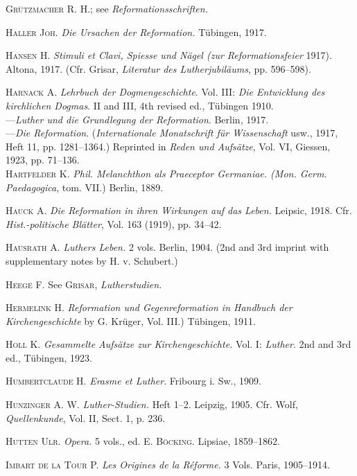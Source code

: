 \textsc{Grützmacher R. H.}; see \textit{Reformationsschriften.}

\textsc{Haller Joh.} \textit{Die Ursachen der Reformation.} Tübingen, 1917.

\textsc{Hansen H.} \textit{Stimuli et Clavi, Spiesse und Nägel (zur Reformationsfeier} 1917).
Altona, 1917. (Cfr. Grisar, \textit{Literatur des Lutherjubiläums}, pp. 596--598).

\textsc{Harnack A.} \textit{Lehrbuch der Dogmengeschichte}. Vol. III: \textit{Die Entwicklung
des kirchlichen Dogmas}. II and III, 4th revised ed., Tübingen 1910. \\
---\textit{Luther und die Grundlegung der Reformation}. Berlin, 1917. \\
---\textit{Die Reformation}. (\textit{Internationale Monatschrift für Wissenschaft} usw.,
1917, Heft 11, pp. 1281--1364.) Reprinted in \textit{Reden und Aufsätze}, Vol.
VI, Giessen, 1923, pp. 71--136. \\

\textsc{Hartfelder K.} \textit{Phil. Melanchthon als Praeceptor Germaniae. (Mon. Germ.
Paedagogica}, tom. VII.) Berlin, 1889.

\textsc{Hauck A.} \textit{Die Reformation in ihren Wirkungen auf das Leben.} Leipsic,
1918. Cfr. \textit{Hist.-politische Blätter}, Vol. 163 (1919), pp. 34--42.

\textsc{Hausrath A.} \textit{Luthers Leben.} 2 vols. Berlin, 1904. (2nd and 3rd imprint
with supplementary notes by H. v. Schubert.)

\textsc{Heege F.} See \textsc{Grisar}, \textit{Lutherstudien.}

\textsc{Hermelink H.} \textit{Reformation und Gegenreformation in Handbuch der
Kirchengeschichte} by G. Krüger, Vol. III.) Tübingen, 1911.

\textsc{Holl K.} \textit{Gesammelte Aufsätze zur Kirchengeschichte.} Vol. I: \textit{Luther}. 2nd
and 3rd ed., Tübingen, 1923.

\textsc{Humbertclaude H.} \textit{Erasme et Luther}. Fribourg i. Sw., 1909.

\textsc{Hunzinger A. W.} \textit{Luther-Studien.} Heft 1--2. Leipzig, 1905. Cfr. Wolf,
\textit{Quellenkunde}, Vol. II, Sect. 1, p. 236.

\textsc{Hutten Ulr.} \textit{Opera.} 5 vols., ed. \textsc{E. Böcking.} Lipsiae, 1859--1862.

\textsc{Imbart de la Tour P.} \textit{Les Origines de la Réforme.} 3 Vols. Paris, 1905--1914.

